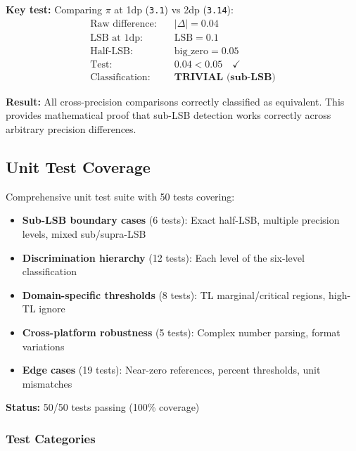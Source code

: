 \documentclass[11pt,letterpaper]{article}
\newcommand{\LSB}{\mathrm{LSB}}
\begin{document}
\noindent\textbf{Key test:} Comparing $\pi$ at 1dp (\texttt{3.1}) vs 2dp (\texttt{3.14}):
\begin{align*}
    \text{Raw difference:} \quad &|\Delta| = 0.04 \\
    \text{LSB at 1dp:} \quad &\LSB = 0.1 \\
    \text{Half-LSB:} \quad &\text{big\_zero} = 0.05 \\
    \text{Test:} \quad &0.04 < 0.05 \quad \checkmark \\
    \text{Classification:} \quad &\textbf{TRIVIAL (sub-LSB)}
\end{align*}

\noindent\textbf{Result:} All cross-precision comparisons correctly classified as equivalent. This provides mathematical proof that sub-LSB detection works correctly across arbitrary precision differences.

\subsection{Unit Test Coverage}

Comprehensive unit test suite with 50 tests covering:

\begin{itemize}
    \item \textbf{Sub-LSB boundary cases} (6 tests): Exact half-LSB, multiple precision levels, mixed sub/supra-LSB
    \item \textbf{Discrimination hierarchy} (12 tests): Each level of the six-level classification
    \item \textbf{Domain-specific thresholds} (8 tests): TL marginal/critical regions, high-TL ignore
    \item \textbf{Cross-platform robustness} (5 tests): Complex number parsing, format variations
    \item \textbf{Edge cases} (19 tests): Near-zero references, percent thresholds, unit mismatches
\end{itemize}

\noindent\textbf{Status:} 50/50 tests passing (100\% coverage)

\subsubsection{Test Categories}
\end{document}

